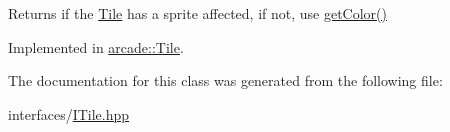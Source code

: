 Returns if the \hyperlink{classarcade_1_1_tile}{Tile} has a sprite affected, if not, use \hyperlink{classarcade_1_1_i_tile_adb20cb553bc2ce17dc23125eb70b8329}{get\-Color()} 



Implemented in \hyperlink{classarcade_1_1_tile_a2584f423e04a31332578a6cde00822a6}{arcade\-::\-Tile}.



The documentation for this class was generated from the following file\-:\begin{DoxyCompactItemize}
\item 
interfaces/\hyperlink{_i_tile_8hpp}{I\-Tile.\-hpp}\end{DoxyCompactItemize}
